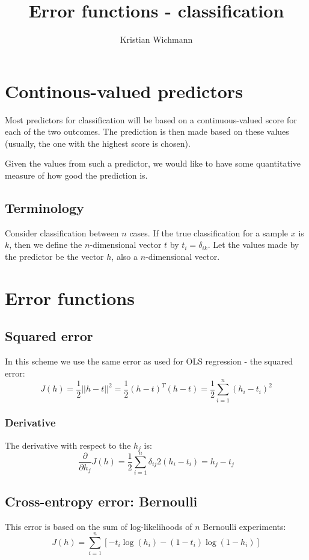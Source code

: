 \documentclass[12pt, a4paper]{article}
\title{Error functions - classification}
\author{Kristian Wichmann}
\numberwithin{equation}{section}
\begin{document}
\maketitle

\section{Continous-valued predictors}
Most predictors for classification will be based on a continuous-valued score for each of the two outcomes. The prediction is then made based on these values (usually, the one with the highest score is chosen).

Given the values from such a predictor, we would like to have some quantitative measure of how good the prediction is.

\subsection{Terminology}
Consider classification between $n$ cases. If the true classification for a sample $x$ is $k$, then we define the $n$-dimensional vector $t$ by $t_i=\delta_{ik}$. Let the values made by the predictor be the vector $h$, also a $n$-dimensional vector.

\section{Error functions}

\subsection{Squared error}
In this scheme we use the same error as used for OLS regression - the squared error:
\begin{equation}
\label{error_squared}
J(h)=\frac{1}{2}||h-t||^2=\frac{1}{2}(h-t)^T(h-t)=\frac{1}{2}\sum_{i=1}^n(h_i-t_i)^2
\end{equation}

\subsubsection{Derivative}
The derivative with respect to the $h_j$ is:
\begin{equation}
\frac{\partial}{\partial h_j}J(h)=\frac{1}{2}\sum_{i=1}^n\delta_{ij}2(h_i-t_i)=h_j-t_j
\end{equation}

\subsection{Cross-entropy error: Bernoulli}
This error is based on the sum of log-likelihoods of $n$ Bernoulli experiments:
\begin{equation}
\label{error_crossentropy_bernoulli}
J(h)=\sum_{i=1}^n\left[-t_i\log(h_i)-(1-t_i)\log(1-h_i)\right]
\end{equation}
\end{document}
